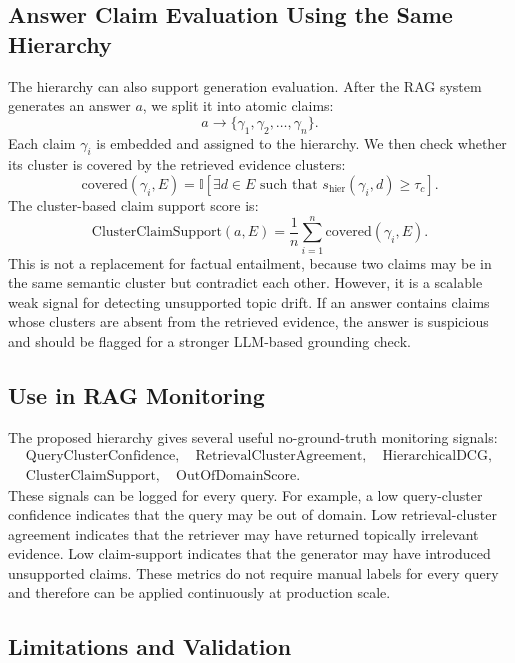 \documentclass[11pt]{article}
\begin{document}
\subsection{Answer Claim Evaluation Using the Same Hierarchy}

The hierarchy can also support generation evaluation. After the RAG system generates an answer $a$, we split it into atomic claims:
\[
a \rightarrow \{\gamma_1, \gamma_2, \ldots, \gamma_n\}.
\]
Each claim $\gamma_i$ is embedded and assigned to the hierarchy. We then check whether its cluster is covered by the retrieved evidence clusters:
\[
\text{covered}(\gamma_i, E) =
\mathbb{I}\left[
\exists d \in E \text{ such that } s_{\text{hier}}(\gamma_i,d) \geq \tau_c
\right].
\]
The cluster-based claim support score is:
\[
\text{ClusterClaimSupport}(a,E) =
\frac{1}{n}\sum_{i=1}^{n}\text{covered}(\gamma_i,E).
\]
This is not a replacement for factual entailment, because two claims may be in the same semantic cluster but contradict each other. However, it is a scalable weak signal for detecting unsupported topic drift. If an answer contains claims whose clusters are absent from the retrieved evidence, the answer is suspicious and should be flagged for a stronger LLM-based grounding check.

\subsection{Use in RAG Monitoring}

The proposed hierarchy gives several useful no-ground-truth monitoring signals:
\[
\begin{gathered}
\text{QueryClusterConfidence}, \quad
\text{RetrievalClusterAgreement}, \quad
\text{HierarchicalDCG}, \\
\text{ClusterClaimSupport}, \quad
\text{OutOfDomainScore}.
\end{gathered}
\]
These signals can be logged for every query. For example, a low query-cluster confidence indicates that the query may be out of domain. Low retrieval-cluster agreement indicates that the retriever may have returned topically irrelevant evidence. Low claim-support indicates that the generator may have introduced unsupported claims. These metrics do not require manual labels for every query and therefore can be applied continuously at production scale.

\subsection{Limitations and Validation}
\end{document}
